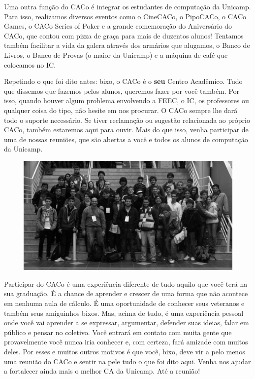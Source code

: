 Uma outra função do CACo é integrar os estudantes de computação da Unicamp. Para
isso, realizamos diversos eventos como o CineCACo, o PipoCACo, o CACo Games, o
CACo Series of Poker e a grande comemoração do Aniversário do CACo, que contou
com pizza de graça para mais de duzentos alunos! Tentamos também facilitar a
vida da galera através dos armários que alugamos, o Banco de Livros, o Banco de
Provas (o maior da Unicamp) e a máquina de café que colocamos no IC.

Repetindo o que foi dito antes: bixo, o CACo é o \textbf{seu} Centro Acadêmico.
Tudo que dissemos que fazemos pelos alunos, queremos fazer por você também. Por
isso, quando houver algum problema envolvendo a FEEC, o IC, os professores ou
qualquer coisa do tipo, não hesite em nos procurar. O CACo sempre lhe dará todo
o suporte necessário. Se tiver reclamação ou sugestão relacionada ao próprio
CACo, também estaremos aqui para ouvir. Mais do que isso, venha participar de
uma de nossas reuniões, que são abertas a você e todos os alunos de computação
da Unicamp.

\begin{figure}[H]
    \centering
    \includegraphics[scale=0.21]{img/caco/fisl2.jpg}
\end{figure}

Participar do CACo é uma experiência diferente de tudo aquilo que você terá na
sua graduação. É a chance de aprender e crescer de uma forma que não acontece em
nenhuma aula de cálculo. É uma oportunidade de conhecer seus veteranos e também
seus amiguinhos bixos. Mas, acima de tudo, é uma experiência pessoal onde você
vai aprender a se expressar, argumentar, defender suas ideias, falar em público
e pensar no coletivo. Você entrará em contato com muita gente que provavelmente
você nunca iria conhecer e, com certeza, fará amizade com muitos deles. Por
esses e muitos outros motivos é que você, bixo, deve vir a pelo menos uma
reunião do CACo e sentir na pele tudo o que foi dito aqui. Venha nos ajudar a
fortalecer ainda mais o melhor CA da Unicamp. Até a reunião!

